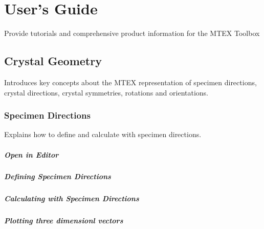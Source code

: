 \documentclass{article}
\begin{document}
		\chapter{User's Guide}

		
               \begin{par}
Provide tutorials and comprehensive product information for the MTEX Toolbox
\end{par} \vspace{1em}

            
		\section{Crystal Geometry}

		
                  \begin{par}
Introduces key concepts about the MTEX representation of specimen directions, crystal directions, crystal symmetries, rotations and orientations.
\end{par} \vspace{1em}

               
		\subsection{Specimen Directions}

		
                     \begin{par}
Explains how to define and calculate with specimen directions.
\end{par} \vspace{1em}

                  
			\paragraph{Open in Editor}
		
			\paragraph{Defining Specimen Directions}
		
			\paragraph{Calculating with Specimen Directions}
		
			\paragraph{Plotting three dimensionl vectors}
		
\end{document}
